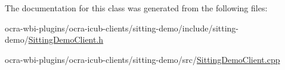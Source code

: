 \-The documentation for this class was generated from the following files\-:\begin{DoxyCompactItemize}
\item 
ocra-\/wbi-\/plugins/ocra-\/icub-\/clients/sitting-\/demo/include/sitting-\/demo/\hyperlink{SittingDemoClient_8h}{\-Sitting\-Demo\-Client.\-h}\item 
ocra-\/wbi-\/plugins/ocra-\/icub-\/clients/sitting-\/demo/src/\hyperlink{SittingDemoClient_8cpp}{\-Sitting\-Demo\-Client.\-cpp}\end{DoxyCompactItemize}
